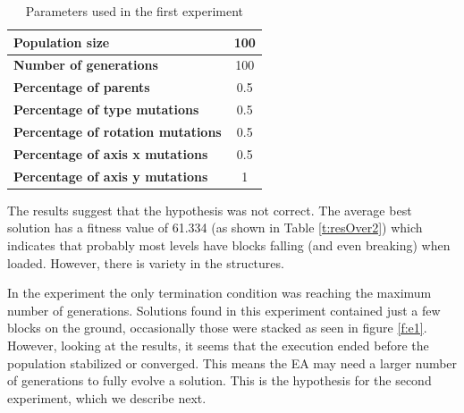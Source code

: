 \documentclass[sigconf]{acmart}
\newcommand{\myfloatalign}{\centering} %
\begin{document}

\begin{table}
	\myfloatalign
	\caption{Parameters used in the first experiment} 
	\label{t:base}
	\begin{tabular}{lc}
		\hline
		\textbf{Population size} & 100 \\ \hline
		\textbf{Number of generations} & 100 \\  \hline
		\textbf{Percentage of parents} &  0.5 \\  \hline
		\textbf{Percentage of type mutations} & 0.5 \\  \hline
		\textbf{Percentage of rotation mutations} & 0.5 \\  \hline
		\textbf{Percentage of axis x mutations}  & 0.5 \\  \hline
		\textbf{Percentage of axis y mutations}  & 1 \\  \hline
	\end{tabular}
\end{table}

The results suggest that the hypothesis was not correct. The average best 
solution has a fitness value of 61.334 (as shown in Table \ref{t:resOver2}) 
which indicates that probably most levels have blocks falling (and even 
breaking) when loaded. However, there is variety in the structures.

In the experiment the only termination condition was reaching the maximum 
number of generations. Solutions found in this experiment contained just a few blocks on the ground,
occasionally those were stacked as seen in figure \ref{f:e1}.
However, looking at the results, it seems that the 
execution ended before the population stabilized or converged.
This means the EA may need a 
larger number of generations to fully evolve a solution. This is the hypothesis 
for the second experiment, which we describe next.
\end{document}

